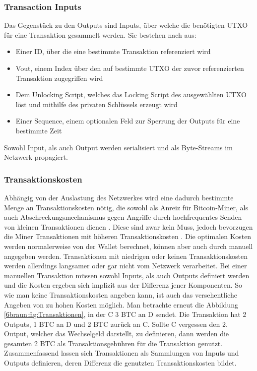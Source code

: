 \subsubsection{Transaction Inputs}
Das Gegenstück zu den Outputs sind Inputs, über welche die benötigten UTXO für eine Transaktion gesammelt werden. Sie bestehen nach \cite{antanopoulos_2014} aus:
\begin{itemize}
	\item Einer ID, über die eine bestimmte Transaktion referenziert wird
	\item Vout, einem Index über den auf bestimmte UTXO der zuvor referenzierten Transaktion zugegriffen wird
	\item Dem Unlocking Script, welches das Locking Script des ausgewählten UTXO löst und mithilfe des privaten Schlüssels erzeugt wird
	\item Einer Sequence, einem optionalen Feld zur Sperrung der Outputs für eine bestimmte Zeit
\end{itemize}
Sowohl Input, als auch Output werden serialisiert und als Byte-Streams im Netzwerk propagiert.\\
\subsubsection{Transaktionskosten}
Abhängig von der Auslastung des Netzwerkes wird eine dadurch bestimmte Menge an Transaktionskosten nötig, die sowohl als Anreiz für Bitcoin-Miner, als auch Abschreckungsmechanismus gegen Angriffe durch hochfrequentes Senden von kleinen Transaktionen dienen \cite[]{antanopoulos_2014}.
Diese sind zwar kein Muss, jedoch bevorzugen die Miner Transaktionen mit höheren Transaktionskosten \cite[]{khairuddin_sas_2019}. 
Die optimalen Kosten werden normalerweise von der Wallet berechnet, können aber auch durch manuell angegeben werden. Transaktionen mit niedrigen oder keinen Transaktionskosten werden allerdings langsamer oder gar nicht vom Netzwerk verarbeitet.
Bei einer manuellen Transaktion müssen sowohl Inputs, als auch Outputs definiert werden und die Kosten ergeben sich implizit aus der Differenz jener Komponenten. So wie man keine Transaktionskosten angeben kann, ist auch das versehentliche Angeben von zu hohen Kosten möglich. Man betrachte erneut die Abbildung \ref{6braun:fig:Transaktionen}, in der C 3 BTC an D sendet. Die Transaktion hat 2 Outputs, 1 BTC an D und 2 BTC zurück an C. Sollte C vergessen den 2. Output, welcher das Wechselgeld darstellt, zu definieren, dann werden die gesamten 2 BTC als Transaktionsgebühren für die Transaktion genutzt.
Zusammenfassend lassen sich Transaktionen als Sammlungen von Inputs und Outputs definieren, deren Differenz die genutzten Transaktionskosten bildet.
